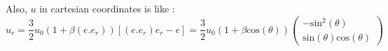 \documentclass[options]{article}
\begin{document}
\vspace{0.5 cm}
Also, $u$ in cartesian coordinates is like :
\begin{equation*}
\boxed{u_r = \frac{3}{2}u_0(1+\beta (e.e_r)) [(e.e_r)e_r - e]
    = \frac{3}{2}u_0\left(1+\beta \mathrm{cos}(\theta) \right) \begin{pmatrix}
   -\mathrm{sin}^2(\theta) \\
   \mathrm{sin}(\theta)\mathrm{cos}(\theta)
\end{pmatrix}}
\end{equation*}

\nocite{*}


\end{document}
